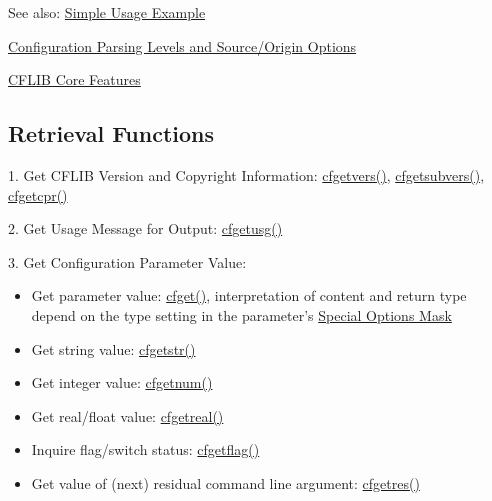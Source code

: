 \begin{Desc}
\item[See also:]\hyperlink{simple_example}{Simple Usage Example} 

\hyperlink{config_levels}{Configuration Parsing Levels and Source/Origin Options} 

\hyperlink{group__cflib__core}{CFLIB Core Features}\end{Desc}
\hypertarget{index_retrieval_functions}{}\subsection{Retrieval Functions}\label{index_retrieval_functions}
1. Get CFLIB Version and Copyright Information: \hyperlink{group__retrieval_gc4e376e3630e9b25655ee0e0b1a54a5b}{cfgetvers()}, \hyperlink{group__retrieval_gbd4ca2adbcac9eef4d1363424e440662}{cfgetsubvers()}, \hyperlink{group__retrieval_g9999522b2acf8760f420d2567e7f7c50}{cfgetcpr()}

2. Get Usage Message for Output: \hyperlink{group__retrieval_ge272c1881db940e56c8cc364df730271}{cfgetusg()}

3. Get Configuration Parameter Value:

\begin{itemize}
\item Get parameter value: \hyperlink{group__retrieval_g5e2da3f6cf3e36a910362660d167f790}{cfget()}, interpretation of content and return type depend on the type setting in the parameter's \hyperlink{group__special__options__mask}{Special Options Mask}\item Get string value: \hyperlink{group__retrieval_g8cf5f53c5b05ec5ca4f5145010f84eb4}{cfgetstr()}\item Get integer value: \hyperlink{group__retrieval_g591b741a05205e1ddd599146b996d755}{cfgetnum()}\item Get real/float value: \hyperlink{group__retrieval_g5f5ec5179e69c2bdfb06ff38a5af16e4}{cfgetreal()}\item Inquire flag/switch status: \hyperlink{group__retrieval_gc0188464b59267e14b5c44efb1d4a0f2}{cfgetflag()}\item Get value of (next) residual command line argument: \hyperlink{group__retrieval_g6ef6076e946383ab198ee26b9aa5603a}{cfgetres()}\end{itemize}



